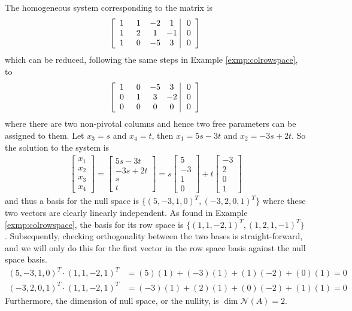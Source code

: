 \begin{solution}
The homogeneous system corresponding to the matrix is
\begin{align*}
\left[\begin{array}{@{\;}wc{10pt}wc{10pt}wc{10pt}wc{10pt}|wc{10pt}@{\;}}
1 & 1 & -2 & 1 & 0\\
1 & 2 & 1 & -1 & 0\\
1 & 0 & -5 & 3 & 0
\end{array}\right]
\end{align*}
which can be reduced, following the same steps in Example \ref{exmp:colrowspace}, to
\begin{align*}
\left[\begin{array}{@{\;}wc{10pt}wc{10pt}wc{10pt}wc{10pt}|wc{10pt}@{\;}}
1 & 0 & -5 & 3 & 0 \\
0 & 1 & 3 & -2 & 0\\
0 & 0 & 0 & 0 & 0
\end{array}\right]
\end{align*}
where there are two non-pivotal columns and hence two free parameters can be assigned to them. Let $x_3 = s$ and $x_4 = t$, then $x_1 = 5s - 3t$ and $x_2 = -3s + 2t$. So the solution to the system is
\begin{align*}
\begin{bmatrix}
x_1 \\
x_2 \\
x_3 \\
x_4
\end{bmatrix}
=
\begin{bmatrix}
5s-3t \\
-3s+2t \\
s \\
t
\end{bmatrix}
=
s
\begin{bmatrix}
5\\
-3\\
1\\
0
\end{bmatrix}
+ t
\begin{bmatrix}
-3 \\
2 \\
0 \\
1
\end{bmatrix}
\end{align*}
and thus a basis for the null space is $\{(5,-3,1,0)^T, (-3,2,0,1)^T\}$ where these two vectors are clearly linearly independent. As found in Example \ref{exmp:colrowspace}, the basis for its row space is $\{(1,1,-2,1)^T, (1,2,1,-1)^T\}$. Subsequently, checking orthogonality between the two bases is straight-forward, and we will only do this for the first vector in the row space basis against the null space basis.
\begin{align*}
(5,-3,1,0)^T \cdot (1,1,-2,1)^T &= (5)(1)+(-3)(1)+(1)(-2)+(0)(1) = 0 \\
(-3,2,0,1)^T \cdot (1,1,-2,1)^T &= (-3)(1)+(2)(1)+(0)(-2)+(1)(1) = 0
\end{align*}
Furthermore, the dimension of null space, or the nullity, is $\dim{\mathcal{N}(A)} = 2$.
\end{solution}
